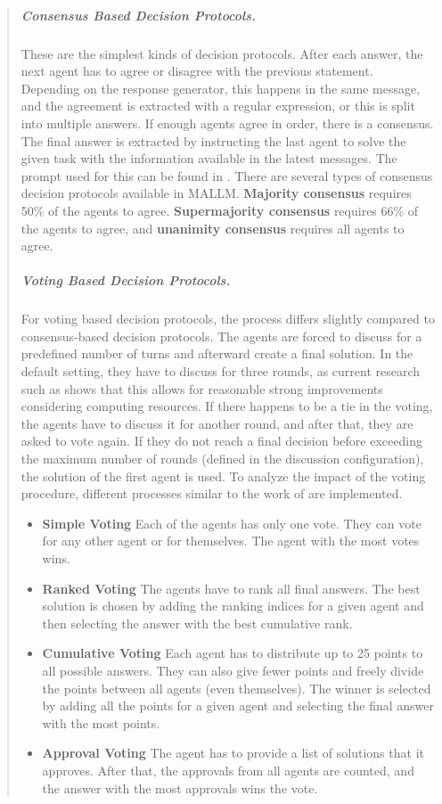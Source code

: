 \documentclass[11pt]{article}
\begin{document}
\begin{abstract}
\subparagraph{Consensus Based Decision Protocols.} 
These are the simplest kinds of decision protocols. After each answer, the next agent has to agree or disagree with the previous statement. Depending on the response generator, this happens in the same message, and the agreement is extracted with a regular expression, or this is split into multiple answers. If enough agents agree in order, there is a consensus. The final answer is extracted by instructing the last agent to solve the given task with the information available in the latest messages. The prompt used for this can be found in . There are several types of consensus decision protocols available in \ac{MALLM}. \textbf{Majority consensus} requires 50\% of the agents to agree. \textbf{Supermajority consensus} requires 66\% of the agents to agree, and \textbf{unanimity consensus} requires all agents to agree.

\subparagraph{Voting Based Decision Protocols.}
For voting based decision protocols, the process differs slightly compared to consensus-based decision protocols. The agents are forced to discuss for a predefined number of turns and afterward create a final solution. In the default setting, they have to discuss for three rounds, as current research such as \citet{du_improving_2023} shows that this allows for reasonable strong improvements considering computing resources. If there happens to be a tie in the voting, the agents have to discuss it for another round, and after that, they are asked to vote again. If they do not reach a final decision before exceeding the maximum number of rounds (defined in the discussion configuration), the solution of the first agent is used. To analyze the impact of the voting procedure, different processes similar to the work of \citet{yang_llm_2024} are implemented.
\begin{itemize}
    \item \textbf{Simple Voting} Each of the agents has only one vote. They can vote for any other agent or for themselves. The agent with the most votes wins.
    \item \textbf{Ranked Voting} The agents have to rank all final answers. The best solution is chosen by adding the ranking indices for a given agent and then selecting the answer with the best cumulative rank.
    \item \textbf{Cumulative Voting} Each agent has to distribute up to 25 points to all possible answers. They can also give fewer points and freely divide the points between all agents (even themselves). The winner is selected by adding all the points for a given agent and selecting the final answer with the most points.
    \item \textbf{Approval Voting} The agent has to provide a list of solutions that it approves. After that, the approvals from all agents are counted, and the answer with the most approvals wins the vote.
\end{itemize}


\end{abstract}
\end{document}
